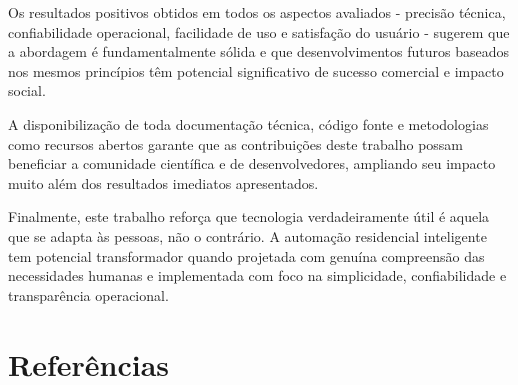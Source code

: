 Os resultados positivos obtidos em todos os aspectos avaliados - precisão técnica, confiabilidade operacional, facilidade de uso e satisfação do usuário - sugerem que a abordagem é fundamentalmente sólida e que desenvolvimentos futuros baseados nos mesmos princípios têm potencial significativo de sucesso comercial e impacto social.

A disponibilização de toda documentação técnica, código fonte e metodologias como recursos abertos garante que as contribuições deste trabalho possam beneficiar a comunidade científica e de desenvolvedores, ampliando seu impacto muito além dos resultados imediatos apresentados.

Finalmente, este trabalho reforça que tecnologia verdadeiramente útil é aquela que se adapta às pessoas, não o contrário. A automação residencial inteligente tem potencial transformador quando projetada com genuína compreensão das necessidades humanas e implementada com foco na simplicidade, confiabilidade e transparência operacional.

\chapter*{Referências}


